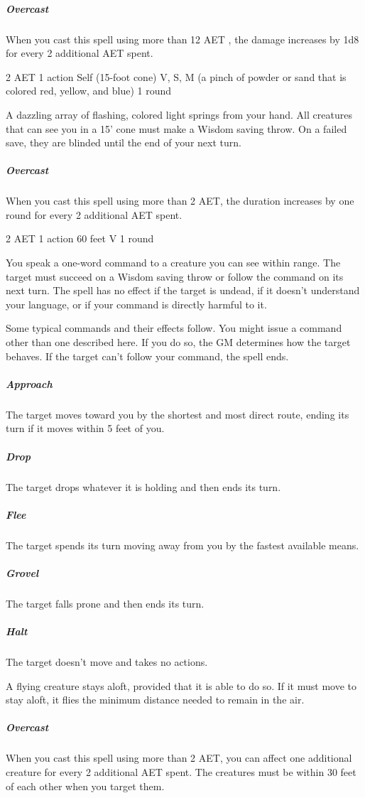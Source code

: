 \subparagraph*{Overcast} When you cast this spell using more than 12 AET , the damage increases by 1d8 for every 2 additional AET spent.


{2 AET}
{1 action}
{Self (15-foot cone)}
{V, S, M (a pinch of powder or sand that is colored red, yellow, and blue)}
{1 round}

A dazzling array of flashing, colored light springs from your hand. All creatures that can see you in a 15' cone must make a Wisdom saving throw. On a failed save, they are blinded until the end of your next turn. 

\subparagraph*{Overcast} When you cast this spell using more than 2 AET, the duration increases by one round for every 2 additional AET spent.


{2 AET}
{1 action}
{60 feet}
{V}
{1 round}

You speak a one-word command to a creature you can see within range. The target must succeed on a Wisdom saving throw or follow the command on its next turn. The spell has no effect if the target is undead, if it doesn't understand your language, or if your command is directly harmful to it.

Some typical commands and their effects follow. You might issue a command other than one described here. If you do so, the GM determines how the target behaves. If the target can't follow your command, the spell ends.

\subparagraph*{Approach} The target moves toward you by the shortest and most direct route, ending its turn if it moves within 5 feet of you.

\subparagraph*{Drop} The target drops whatever it is holding and then ends its turn.

\subparagraph*{Flee} The target spends its turn moving away from you by the fastest available means.

\subparagraph*{Grovel} The target falls prone and then ends its turn.

\subparagraph*{Halt} The target doesn't move and takes no actions.

A flying creature stays aloft, provided that it is able to do so. If it must move to stay aloft, it flies the minimum distance needed to remain in the air.

\subparagraph*{Overcast} When you cast this spell using more than 2 AET, you can affect one additional creature for every 2 additional AET spent. The creatures must be within 30 feet of each other when you target them.


